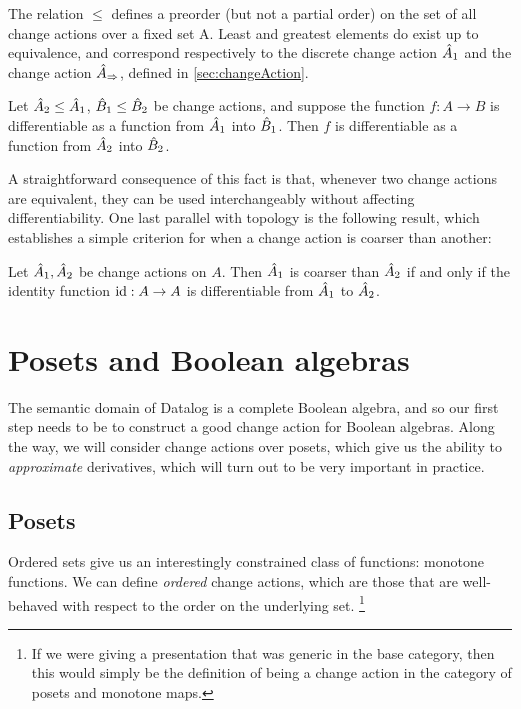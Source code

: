 The relation $\leq$  defines a preorder (but not a partial order) on the set of all change actions 
over a fixed set A. Least and greatest elements do exist up to equivalence, and correspond
respectively to the discrete change action $\hat{A}_1$ and the change action $\hat{A}_\Rightarrow$,
defined in \cref{sec:changeAction}.

\begin{prop}
  Let $\hat{A}_2 \leq \hat{A}_1$, $\hat{B}_1 \leq \hat{B}_2$ be change actions, and suppose
  the function $f : A \rightarrow B$ is differentiable as a function from $\hat{A}_1$ into
  $\hat{B}_1$. Then $f$ is differentiable as a function from $\hat{A}_2$ into $\hat{B}_2$.
\end{prop}

A straightforward consequence of this fact is that, whenever two change actions are equivalent,
they can be used interchangeably without affecting differentiability. One last parallel with topology
is the following result, which establishes a simple criterion for when a change action is coarser than
another:

\begin{prop}
  Let $\hat{A}_1, \hat{A}_2$ be change actions on $A$. Then $\hat{A}_1$ is coarser than $\hat{A}_2$
  if and only if the identity function $\operatorname{id} : A \rightarrow A$ is differentiable from $\hat{A}_1$ to
  $\hat{A}_2$.
\end{prop}

\section{Posets and Boolean algebras}
\label{sec:moreStructures}

The semantic domain of Datalog is a complete Boolean algebra, and so our first step needs
to be to construct a good change action for Boolean algebras. Along the way, we
will consider change actions over posets, which give us the ability to
\emph{approximate} derivatives, which will turn out to be very important in practice.

\subsection{Posets}

Ordered sets give us an interestingly constrained class of functions: monotone
functions. We can define \emph{ordered} change actions, which are those that
are well-behaved with respect to the order on the underlying set.
\footnote{If we were giving a presentation that was
generic in the base category, then this would simply be the definition of being
a change action in the category of posets and monotone maps.}

